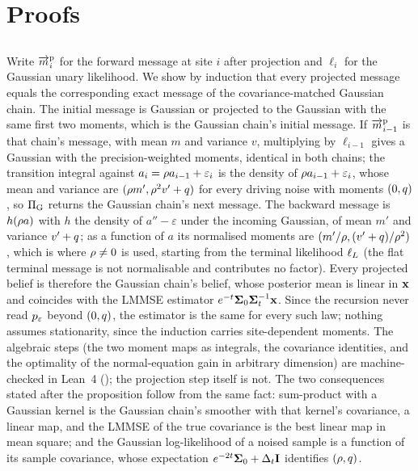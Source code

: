 \section{Proofs}
\label{app:proofs}

\subsection{}
Write $\overrightarrow{m}^{\mathrm{p}}_i$ for the forward message at site $i$ after projection and
$\ell_i$ for the Gaussian unary likelihood. We show by induction that every projected
message equals the corresponding exact message of the covariance-matched Gaussian chain.
The initial message is Gaussian or projected to the Gaussian with the same first two
moments, which is the Gaussian chain's initial message. If $\overrightarrow{m}^{\mathrm{p}}_{i-1}$ is
that chain's message, with mean $m$ and variance $v$, multiplying by $\ell_{i-1}$ gives
a Gaussian with the precision-weighted moments, identical in both chains; the transition
integral against $a_i=\rho a_{i-1}+\varepsilon_i$ is the density of $\rho a_{i-1}+\varepsilon_i$,
whose mean and variance are $(\rho m',\rho^2v'+q)$ for every driving noise with
moments $(0,q)$, so $\Pi_{\mathrm{G}}$ returns the Gaussian chain's next message. The
backward message is $h(\rho a)$ with $h$ the density of $a''-\varepsilon$ under the
incoming Gaussian, of mean $m'$ and variance $v'+q$; as a function of $a$ its
normalised moments are $(m'/\rho,(v'+q)/\rho^2)$, which is where $\rho\neq0$ is
used, starting from the terminal likelihood $\ell_{L}$ (the flat terminal message
is not normalisable and contributes no factor). Every projected belief is therefore the
Gaussian chain's belief, whose posterior mean is linear in $\mathbf{x}$ and coincides with the
LMMSE estimator $e^{-t}\mathbf{\Sigma}_0\mathbf{\Sigma}_t^{-1}\mathbf{x}$. Since the recursion never read $p_{\varepsilon}$
beyond $(0,q)$, the estimator is the same for every such law; nothing assumes
stationarity, since the induction carries site-dependent moments. The algebraic steps
(the two moment maps as integrals, the covariance identities, and the optimality of the
normal-equation gain in arbitrary dimension) are machine-checked in Lean~4
(); the projection step itself is not. The two consequences
stated after the proposition follow from the same fact: sum-product with a Gaussian
kernel is the Gaussian chain's smoother with that kernel's covariance, a linear map, and
the LMMSE of the true covariance is the best linear map in mean square; and the Gaussian
log-likelihood of a noised sample is a function of its sample covariance, whose
expectation $e^{-2t}\mathbf{\Sigma}_0+\Delta_t\mathbf{I}$ identifies $(\rho,q)$.

